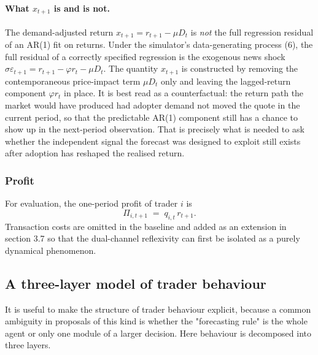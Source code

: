 \documentclass[11pt]{article}
\begin{document}
\paragraph{What $x_{t+1}$ is and is not.} The demand-adjusted return $x_{t+1} = r_{t+1} - \mu D_t$ is \emph{not} the full regression residual of an AR(1) fit on returns. Under the simulator's data-generating process (6), the full residual of a correctly specified regression is the exogenous news shock $\sigma \varepsilon_{t+1} = r_{t+1} - \varphi r_t - \mu D_t$. The quantity $x_{t+1}$ is constructed by removing the contemporaneous price-impact term $\mu D_t$ only and leaving the lagged-return component $\varphi r_t$ in place. It is best read as a counterfactual: the return path the market would have produced had adopter demand not moved the quote in the current period, so that the predictable AR(1) component still has a chance to show up in the next-period observation. That is precisely what is needed to ask whether the independent signal the forecast was designed to exploit still exists after adoption has reshaped the realised return.

\subsubsection{Profit}

For evaluation, the one-period profit of trader $i$ is
\begin{equation}
  \Pi_{i,t+1} \;=\; q_{i,t}\, r_{t+1}.
\end{equation}
Transaction costs are omitted in the baseline and added as an extension in section 3.7 so that the dual-channel reflexivity can first be isolated as a purely dynamical phenomenon.


\subsection{A three-layer model of trader behaviour}

It is useful to make the structure of trader behaviour explicit, because a common ambiguity in proposals of this kind is whether the "forecasting rule" is the whole agent or only one module of a larger decision. Here behaviour is decomposed into three layers.
\end{document}
